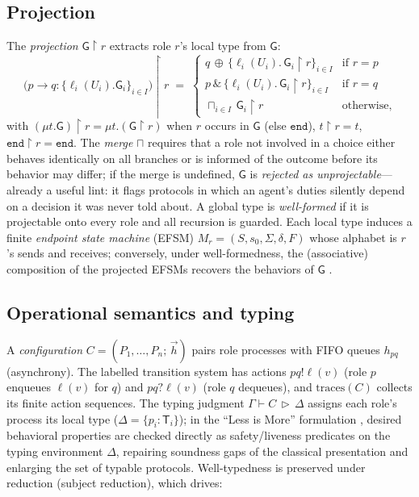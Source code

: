 \documentclass{article}
\newcommand{\gtG}{\mathsf{G}}
\newcommand{\lt}{\mathsf{T}}
\newcommand{\ed}{\mathtt{end}}
\newcommand{\proj}[2]{#1\!\upharpoonright\!#2}
\newcommand{\sends}{\rightarrow}
\newcommand{\merge}{\sqcap}
\newcommand{\lbl}{\ell}
\begin{document}
\subsection{Projection}
The \emph{projection} $\proj{\gtG}{r}$ extracts role $r$'s local type from $\gtG$:
\[
\proj{\big(p \sends q : \{\lbl_i(U_i).\gtG_i\}_{i\in I}\big)}{r} \;=\;
\begin{cases}
q\,{\oplus}\,\{\lbl_i(U_i).\,\proj{\gtG_i}{r}\}_{i\in I} & \text{if } r=p\\[2pt]
p\,\&\,\{\lbl_i(U_i).\,\proj{\gtG_i}{r}\}_{i\in I} & \text{if } r=q\\[2pt]
\sqcap_{i\in I}\, \proj{\gtG_i}{r} & \text{otherwise,}
\end{cases}
\]
with $\proj{(\mu t.\gtG)}{r}=\mu t.(\proj{\gtG}{r})$ when $r$ occurs in $\gtG$ (else $\ed$), $\proj{t}{r}=t$, $\proj{\ed}{r}=\ed$. The \emph{merge} $\merge$ requires that a role not involved in a choice either behaves identically on all branches or is informed of the outcome before its behavior may differ; if the merge is undefined, $\gtG$ is \emph{rejected as unprojectable}---already a useful lint: it flags protocols in which an agent's duties silently depend on a decision it was never told about. A global type is \emph{well-formed} if it is projectable onto every role and all recursion is guarded. Each local type induces a finite \emph{endpoint state machine} (EFSM) $M_r=(S,s_0,\Sigma,\delta,F)$ whose alphabet is $r$'s sends and receives; conversely, under well-formedness, the (associative) composition of the projected EFSMs recovers the behaviors of $\gtG$ \citep{denielou12}.

\subsection{Operational semantics and typing}
A \emph{configuration} $C=(P_1,\ldots,P_n;\,\vec h)$ pairs role processes with FIFO queues $h_{pq}$ (asynchrony). The labelled transition system has actions $pq!\lbl(v)$ (role $p$ enqueues $\lbl(v)$ for $q$) and $pq?\lbl(v)$ (role $q$ dequeues), and $\mathrm{traces}(C)$ collects its finite action sequences. The typing judgment $\Gamma \vdash C \,\triangleright\, \Delta$ assigns each role's process its local type ($\Delta = \{p_i : \lt_i\}$); in the ``Less is More'' formulation \citep{scalas19}, desired behavioral properties are checked directly as safety/liveness predicates on the typing environment $\Delta$, repairing soundness gaps of the classical presentation and enlarging the set of typable protocols. Well-typedness is preserved under reduction (subject reduction), which drives:
\end{document}
